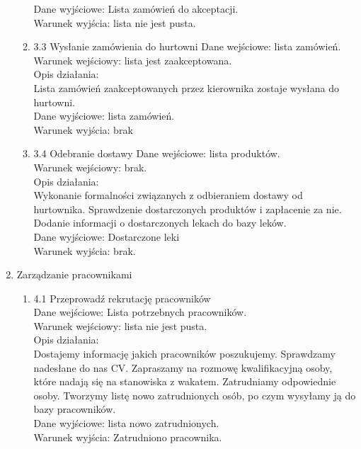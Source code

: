 \documentclass[a4paper, 11pt]{article}
\begin{document}
\begin{enumerate}
\begin{enumerate}
	Dane wyjściowe: Lista zamówień do akceptacji.\\
	Warunek wyjścia: lista nie jest pusta.\\
		\item 3.3 Wysłanie zamówienia do hurtowni	
	Dane wejściowe: lista zamówień.\\
	Warunek wejściowy: lista jest zaakceptowana.\\
	Opis działania:\\
		Lista zamówień zaakceptowanych przez kierownika zostaje wysłana do hurtowni.\\
		
	Dane wyjściowe: lista zamówień. \\
	Warunek wyjścia: brak\\
		\item 3.4 Odebranie dostawy
	Dane wejściowe: lista produktów.\\
	Warunek wejściowy: brak.\\
	Opis działania:\\
		Wykonanie formalności związanych z odbieraniem dostawy od hurtownika. Sprawdzenie dostarczonych produktów i zapłacenie za nie. Dodanie informacji o dostarczonych lekach do bazy leków. \\
		
	Dane wyjściowe: Dostarczone leki\\
	Warunek wyjścia: brak.\\
	\end{enumerate}
	
	
	\item Zarządzanie pracownikami\\
	\begin{enumerate}
	\item 4.1 Przeprowadź rekrutację pracowników	\\
	Dane wejściowe: Lista potrzebnych pracowników.\\
	Warunek wejściowy: lista nie jest pusta.\\
	Opis działania:\\
		Dostajemy informację jakich pracowników poszukujemy. Sprawdzamy nadesłane do nas CV. Zapraszamy na rozmowę kwalifikacyjną osoby, które nadają się na stanowiska z wakatem. Zatrudniamy odpowiednie osoby. Tworzymy listę nowo zatrudnionych osób, po czym wysyłamy ją do bazy pracowników. \\
		
	Dane wyjściowe: lista nowo zatrudnionych.\\
	Warunek wyjścia: Zatrudniono pracownika.\\
	

\end{enumerate}
\end{enumerate}
\end{document}
